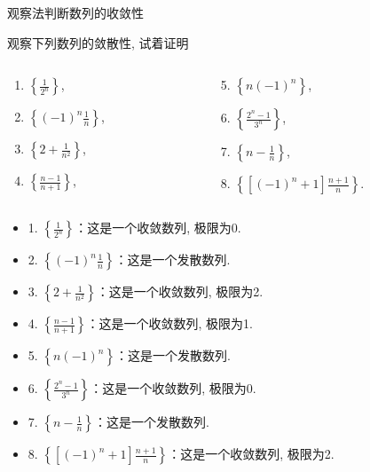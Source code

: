 \documentclass[
10pt,
aspectratio=43,
]{beamer}
\begin{document}
\begin{frame}{观察法判断数列的收敛性}
	\begin{block}{观察下列数列的敛散性, 试着证明}
		\begin{columns}[onlytextwidth]
			\begin{column}{0.5\textwidth}
				\begin{enumerate}
					\item $\left\{\frac{1}{2^n}\right\}$,
					\item $\left\{(-1)^n \frac{1}{n}\right\}$,
					\item $\left\{2+\frac{1}{n^2}\right\}$,
					\item $\left\{\frac{n-1}{n+1}\right\}$,
				\end{enumerate}
			\end{column}
			\begin{column}{0.5\textwidth}
				\begin{enumerate}
					\setcounter{enumi}{4}
					\item $\left\{n(-1)^n\right\}$,
					\item $\left\{\frac{2^n-1}{3^n}\right\}$,
					\item $\left\{n-\frac{1}{n}\right\}$,
					\item $\left\{\left[(-1)^n+1\right] \frac{n+1}{n}\right\}$.
				\end{enumerate}
			\end{column}
		\end{columns}
	\end{block}

	\pause

	\begin{itemize}
		\item 1. $\left\{\frac{1}{2^n}\right\}$：这是一个收敛数列, 极限为0.
		      \pause
		\item 2. $\left\{(-1)^n \frac{1}{n}\right\}$：这是一个发散数列.
		      \pause
		\item 3. $\left\{2+\frac{1}{n^2}\right\}$：这是一个收敛数列, 极限为2.
		      \pause
		\item 4. $\left\{\frac{n-1}{n+1}\right\}$：这是一个收敛数列, 极限为1.
		      \pause
		\item 5. $\left\{n(-1)^n\right\}$：这是一个发散数列.
		      \pause
		\item 6. $\left\{\frac{2^n-1}{3^n}\right\}$：这是一个收敛数列, 极限为0.
		      \pause
		\item 7. $\left\{n-\frac{1}{n}\right\}$：这是一个发散数列.
		      \pause
		\item 8. $\left\{\left[(-1)^n+1\right] \frac{n+1}{n}\right\}$：这是一个收敛数列, 极限为2.
	\end{itemize}
\end{frame}
\end{document}

